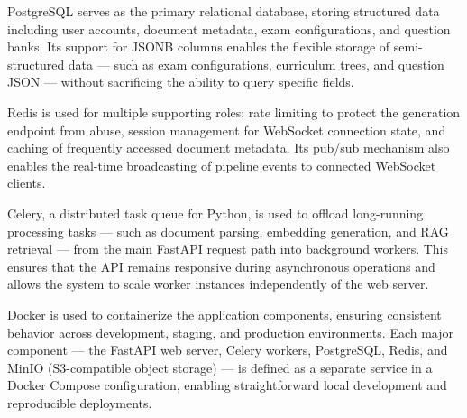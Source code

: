 \documentclass[12pt,a4paper]{article}
\begin{document}
PostgreSQL serves as the primary relational database, storing structured data including user accounts, document metadata, exam configurations, and question banks. Its support for JSONB columns enables the flexible storage of semi-structured data — such as exam configurations, curriculum trees, and question JSON — without sacrificing the ability to query specific fields.

Redis is used for multiple supporting roles: rate limiting to protect the generation endpoint from abuse, session management for WebSocket connection state, and caching of frequently accessed document metadata. Its pub/sub mechanism also enables the real-time broadcasting of pipeline events to connected WebSocket clients.

Celery, a distributed task queue for Python, is used to offload long-running processing tasks — such as document parsing, embedding generation, and RAG retrieval — from the main FastAPI request path into background workers. This ensures that the API remains responsive during asynchronous operations and allows the system to scale worker instances independently of the web server.

Docker is used to containerize the application components, ensuring consistent behavior across development, staging, and production environments. Each major component — the FastAPI web server, Celery workers, PostgreSQL, Redis, and MinIO (S3-compatible object storage) — is defined as a separate service in a Docker Compose configuration, enabling straightforward local development and reproducible deployments.
\end{document}
